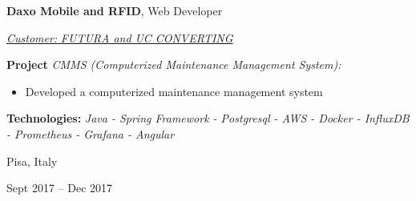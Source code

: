 \documentclass[10pt, a4paper]{article}
\newenvironment{highlights}{
    \begin{itemize}[
        topsep=0.10 cm,
        parsep=0.10 cm,
        partopsep=0pt,
        itemsep=0pt,
        leftmargin=0.4 cm + 10pt
    ]
}{
    \end{itemize}
} %
\newenvironment{twocolentry}[2][]{
    \onecolentry
    \def\secondColumn{#2}
    \setcolumnwidth{\fill, 4.5 cm}
    \begin{paracol}{2}
}{
    \switchcolumn \raggedleft \secondColumn
    \end{paracol}
    \endonecolentry
} %
\begin{document}
        \begin{twocolentry}{
            \fontsize{14}{18}Pisa, Italy

        Sept 2017 – Dec 2017
            \normalsize
        }
            \fontsize{12}{16}
            \textcolor{secondaryColor}{\faBriefcase\hspace{4pt}\textbf{Daxo Mobile and RFID},} Web Developer
            \normalsize

            \vspace{0.10 cm}
                \vspace{0.10 cm}

                \textcolor{tertiaryColor}{\faAngleDoubleRight\hspace{0.1cm}\underline{\textit{Customer:} \textit{FUTURA and UC CONVERTING}}}

                \vspace{0.2cm}
                \textbf{Project \faAngleRight} \textit{CMMS (Computerized Maintenance Management System):}

                \begin{highlights}
                        \item Developed a computerized maintenance management system
                \end{highlights}
                \faBuffer
                \textbf{ Technologies:} \textit{Java - Spring Framework - Postgresql - AWS - Docker - InfluxDB - Prometheus - Grafana - Angular}

                \vspace{0.10 cm}

        \end{twocolentry}


        \vspace{0.2 cm}
\end{document}
